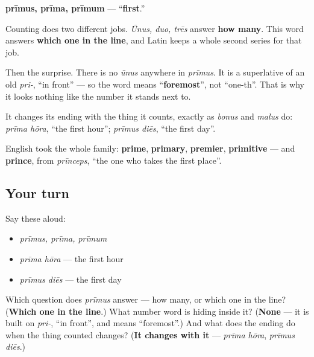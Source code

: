 \begin{cousinweb}
\textbf{prīmus, prīma, prīmum} — \textquotedblleft{}\textbf{first}.\textquotedblright{}

Counting does two different jobs. \emph{Ūnus, duo, trēs} answer \textbf{how many}. This word answers \textbf{which one in the line}, and Latin keeps a whole second series for that job.

Then the surprise. There is no \emph{ūnus} anywhere in \emph{prīmus}. It is a superlative of an old \emph{pri-}, \textquotedblleft{}in front\textquotedblright{} — so the word means \textquotedblleft{}\textbf{foremost}\textquotedblright{}, not \textquotedblleft{}one-th\textquotedblright{}. That is why it looks nothing like the number it stands next to.

It changes its ending with the thing it counts, exactly as \emph{bonus} and \emph{malus} do: \emph{prīma hōra}, \textquotedblleft{}the first hour\textquotedblright{}; \emph{prīmus diēs}, \textquotedblleft{}the first day\textquotedblright{}.

English took the whole family: \textbf{prime}, \textbf{primary}, \textbf{premier}, \textbf{primitive} — and \textbf{prince}, from \emph{prīnceps}, \textquotedblleft{}the one who takes the first place\textquotedblright{}.
\end{cousinweb}

\subsection*{Your turn}
Say these aloud:

\begin{itemize}
\raggedright
  \item \emph{prīmus, prīma, prīmum}
  \item \emph{prīma hōra} — the first hour
  \item \emph{prīmus diēs} — the first day
\end{itemize}

\begin{tcolorbox}[breakable,colback=teal!4,colframe=teal!35!black,title={Before you move on}]
Which question does \emph{prīmus} answer — how many, or which one in the line? (\textbf{Which one in the line}.) What number word is hiding inside it? (\textbf{None} — it is built on \emph{pri-}, \textquotedblleft{}in front\textquotedblright{}, and means \textquotedblleft{}foremost\textquotedblright{}.) And what does the ending do when the thing counted changes? (\textbf{It changes with it} — \emph{prīma hōra}, \emph{prīmus diēs}.)
\end{tcolorbox}
